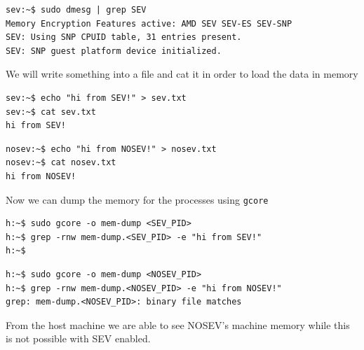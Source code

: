 \documentclass[twocolumn]{article}
\begin{document}
\begin{verbatim}
sev:~$ sudo dmesg | grep SEV
Memory Encryption Features active: AMD SEV SEV-ES SEV-SNP
SEV: Using SNP CPUID table, 31 entries present.
SEV: SNP guest platform device initialized.
\end{verbatim}

We will write something into a file and cat it in order to load the data in memory

\begin{verbatim}
sev:~$ echo "hi from SEV!" > sev.txt
sev:~$ cat sev.txt
hi from SEV!
\end{verbatim}

\begin{verbatim}
nosev:~$ echo "hi from NOSEV!" > nosev.txt
nosev:~$ cat nosev.txt
hi from NOSEV!
\end{verbatim}

Now we can dump the memory for the processes using \texttt{gcore}

\begin{verbatim}
h:~$ sudo gcore -o mem-dump <SEV_PID>
h:~$ grep -rnw mem-dump.<SEV_PID> -e "hi from SEV!"
h:~$
\end{verbatim}

\begin{verbatim}
h:~$ sudo gcore -o mem-dump <NOSEV_PID>
h:~$ grep -rnw mem-dump.<NOSEV_PID> -e "hi from NOSEV!"
grep: mem-dump.<NOSEV_PID>: binary file matches
\end{verbatim}

From the host machine we are able to see NOSEV's machine memory while this is not possible with SEV enabled.
\end{document}
